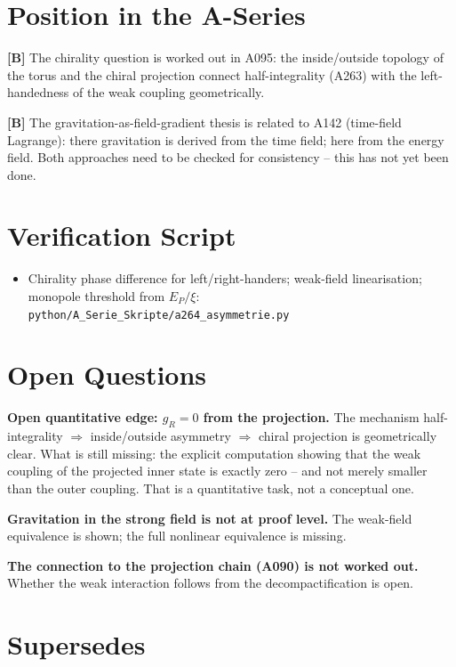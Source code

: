 \section{Position in the A-Series}

\textbf{[B]} The chirality question is worked out in A095: the inside/outside
topology of the torus and the chiral projection connect half-integrality (A263)
with the left-handedness of the weak coupling geometrically.

\textbf{[B]} The gravitation-as-field-gradient thesis is related to A142 (time-field
Lagrange): there gravitation is derived from the time field; here from the energy
field. Both approaches need to be checked for consistency -- this has not yet been done.

\section{Verification Script}

\begin{itemize}[leftmargin=2em,itemsep=2pt,topsep=2pt]
  \item Chirality phase difference for left/right-handers; weak-field linearisation;
    monopole threshold from $E_P/\xi$:
    \texttt{python/A\_Serie\_Skripte/a264\_asymmetrie.py}
\end{itemize}

\section{Open Questions}

\textbf{Open quantitative edge: $g_R=0$ from the projection.}
The mechanism half-integrality $\Rightarrow$ inside/outside asymmetry $\Rightarrow$
chiral projection is geometrically clear. What is still missing: the explicit
computation showing that the weak coupling of the projected inner state is exactly
zero -- and not merely smaller than the outer coupling. That is a quantitative task,
not a conceptual one.

\textbf{Gravitation in the strong field is not at proof level.} The weak-field
equivalence is shown; the full nonlinear equivalence is missing.

\textbf{The connection to the projection chain (A090) is not worked out.} Whether
the weak interaction follows from the decompactification is open.

\section{Supersedes}


